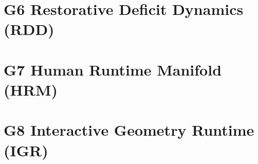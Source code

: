 \documentclass[11pt]{article}
\begin{document}
\section{G6 Restorative Deficit Dynamics (RDD)}


\section{G7 Human Runtime Manifold (HRM)}


\section{G8 Interactive Geometry Runtime (IGR)}



\newpage


\appendix

%

%

%

%

%
\end{document}
